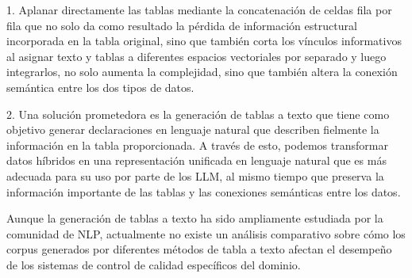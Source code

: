 \documentclass[12pt]{report} %
\begin{document}
1.	Aplanar directamente las tablas mediante la concatenación de celdas fila por fila que no solo da como resultado la pérdida de información estructural incorporada en la tabla original, sino que también corta los vínculos informativos al asignar texto y tablas a diferentes espacios vectoriales por separado y luego integrarlos, no solo aumenta la complejidad, sino que también altera la conexión semántica entre los dos tipos de datos.\par
2.	Una solución prometedora es la generación de tablas a texto que tiene como objetivo generar declaraciones en lenguaje natural que describen fielmente la información en la tabla proporcionada. A través de esto, podemos transformar datos híbridos en una representación unificada en lenguaje natural que es más adecuada para su uso por parte de los LLM, al mismo tiempo que preserva la información importante de las tablas y las conexiones semánticas entre los datos. \par
Aunque la generación de tablas a texto ha sido ampliamente estudiada por la comunidad de NLP, actualmente no existe un análisis comparativo sobre cómo los corpus generados por diferentes métodos de tabla a texto afectan el desempeño de los sistemas de control de calidad específicos del dominio.\cite{4}\par
\end{document}
